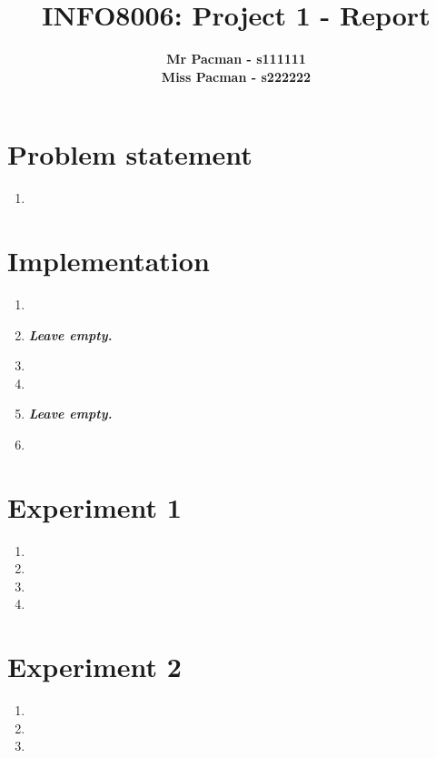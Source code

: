 \documentclass{article}
\begin{document}

\title{\Large{INFO8006: Project 1 - Report}}
\vspace{1cm}
\author{\small{\bf Mr Pacman - s111111} \\ \small{\bf Miss Pacman - s222222}}

\maketitle


\section{Problem statement}

\begin{enumerate}[label=\alph*.,leftmargin=1.35em]
    \item
\end{enumerate}

\section{Implementation}

\begin{enumerate}[label=\alph*.,leftmargin=1.35em]
    \item
    \item \textbf{{\it Leave empty.}}
    \item
    \item
    \item \textbf{{\it Leave empty.}}
    \item
\end{enumerate}

\section{Experiment 1}

\begin{enumerate}[label=\alph*.,leftmargin=1.35em]
    \item
    \item
    \item
    \item
\end{enumerate}

\section{Experiment 2}

\begin{enumerate}[label=\alph*.,leftmargin=1.35em]
    \item
    \item
    \item
\end{enumerate}


\end{document}
